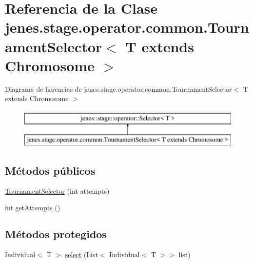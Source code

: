 \hypertarget{classjenes_1_1stage_1_1operator_1_1common_1_1_tournament_selector_3_01_t_01extends_01_chromosome_01_4}{\section{Referencia de la Clase jenes.\-stage.\-operator.\-common.\-Tournament\-Selector$<$ T extends Chromosome $>$}
\label{classjenes_1_1stage_1_1operator_1_1common_1_1_tournament_selector_3_01_t_01extends_01_chromosome_01_4}
}
Diagrama de herencias de jenes.\-stage.\-operator.\-common.\-Tournament\-Selector$<$ T extends Chromosome $>$\begin{figure}[H]
\begin{center}
\leavevmode
\includegraphics[height=2.000000cm]{classjenes_1_1stage_1_1operator_1_1common_1_1_tournament_selector_3_01_t_01extends_01_chromosome_01_4}
\end{center}
\end{figure}
\subsection*{Métodos públicos}
\begin{DoxyCompactItemize}
\item 
\hyperlink{classjenes_1_1stage_1_1operator_1_1common_1_1_tournament_selector_3_01_t_01extends_01_chromosome_01_4_a69674739689660dc1926b06a43f2aa6d}{Tournament\-Selector} (int attempts)
\item 
int \hyperlink{classjenes_1_1stage_1_1operator_1_1common_1_1_tournament_selector_3_01_t_01extends_01_chromosome_01_4_a93a5d890bc7a8f383bda9791baf0460c}{get\-Attempts} ()
\end{DoxyCompactItemize}
\subsection*{Métodos protegidos}
\begin{DoxyCompactItemize}
\item 
Individual$<$ T $>$ \hyperlink{classjenes_1_1stage_1_1operator_1_1common_1_1_tournament_selector_3_01_t_01extends_01_chromosome_01_4_af18e34c3ad12626eb5d8540e05e9877e}{select} (List$<$ Individual$<$ T $>$$>$ list)
\end{DoxyCompactItemize}


